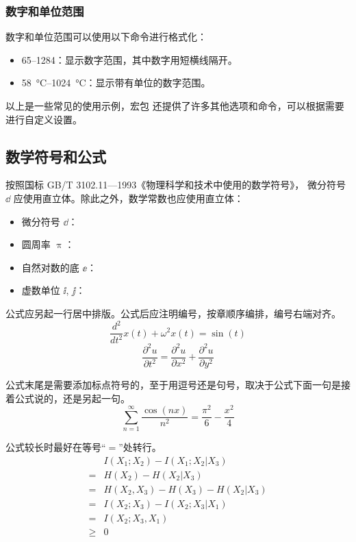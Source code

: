\subsubsection*{数字和单位范围}

数字和单位范围可以使用以下命令进行格式化：

\begin{itemize}
\item \numrange{65}{1284}：显示数字范围，其中数字用短横线隔开。
\item \SIrange{58}{1024}{\degreeCelsius}：显示带有单位的数字范围。
\end{itemize}

以上是一些常见的使用示例，宏包  还提供了许多其他选项和命令，可以根据需要进行自定义设置。

\subsection{数学符号和公式}

按照国标 GB/T 3102.11—1993《物理科学和技术中使用的数学符号》，
微分符号 $\dd$ 应使用直立体。除此之外，数学常数也应使用直立体：
\begin{itemize}
  \item 微分符号 $\dd$：
  \item 圆周率 $\uppi$：
  \item 自然对数的底 $\ee$：
  \item 虚数单位 $\ii$, $\jj$： 
\end{itemize}

公式应另起一行居中排版。公式后应注明编号，按章顺序编排，编号右端对齐。
\begin{equation}
  \frac{d^2}{dt^2}x(t)+\omega^2x(t)=\sin(t)
\end{equation}
\begin{equation}
  \frac{\partial^2u}{\partial t^2}=\frac{\partial^2u}{\partial x^2}+\frac{\partial^2u}{\partial y^2}
\end{equation}

公式末尾是需要添加标点符号的，至于用逗号还是句号，取决于公式下面一句是接着公式说的，还是另起一句。
\begin{equation}
		\sum_{n=1}^{\infty}\frac{\cos(nx)}{n^2}=\frac{\pi^2}{6}-\frac{x^2}{4}
\end{equation}

公式较长时最好在等号“$=$”处转行。
\begin{align}
    & I(X_1;X_2)-I(X_1;X_2|X_3) \nonumber \\
  = & H(X_2)-H(X_2|X_3) \nonumber \\
  = & H(X_2,X_3)-H(X_3)-H(X_2|X_3) \nonumber \\
  = & I(X_2;X_3)-I(X_2;X_3|X_1) \nonumber \\
  = & I(X_2;X_3,X_1) \nonumber \\
  \geq & 0
\end{align}

